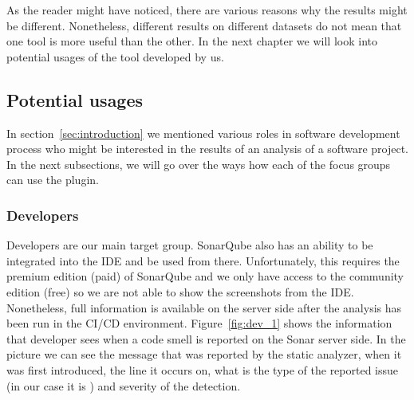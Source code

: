 As the reader might have noticed, there are various reasons why the results might be different.
Nonetheless, different results on different datasets do not mean that one tool is more useful than the other.
In the next chapter we will look into potential usages of the tool developed by us.

\FloatBarrier

\subsection{Potential usages}\label{subsec:potential-usages}


In section~\ref{sec:introduction} we mentioned various roles in software development process who might be interested
in the results of an analysis of a software project.
In the next subsections, we will go over the ways how each of the focus groups can use the plugin.

\subsubsection{Developers}



Developers are our main target group.
SonarQube also has an ability to be integrated into the IDE and be used from there.
Unfortunately, this requires the premium edition (paid) of SonarQube and we only have access to the community edition (free)
so we are not able to show the screenshots from the IDE\@.
Nonetheless, full information is available on the server side after the analysis has been run in the CI/CD environment.
Figure~\ref{fig:dev_1} shows the information that developer sees when a code smell is reported on the Sonar server side.
In the picture we can see the message that was reported by the static analyzer, when it was first introduced,
the line it occurs on, what is the type of the reported issue (in our case it is ) and severity of the detection.

